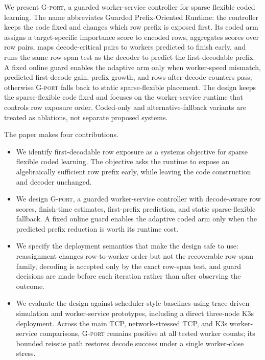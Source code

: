 We present \textsc{G-port}, a guarded worker-service controller for sparse
flexible coded learning.  The name abbreviates Guarded Prefix-Oriented
Runtime: the controller keeps the code fixed and changes which row prefix is
exposed first.  Its coded arm assigns a target-specific importance score to
encoded rows, aggregates scores over row pairs, maps decode-critical pairs to
workers predicted to finish early, and runs the same row-span test as the
decoder to predict the first-decodable prefix.  A fixed online guard
enables the adaptive arm only when worker-speed mismatch, predicted
first-decode gain, prefix growth, and
rows-after-decode counters pass; otherwise \textsc{G-port} falls back to static
sparse-flexible placement.  The design keeps the
sparse-flexible code fixed and focuses on the worker-service runtime that
controls row exposure order.  Coded-only and alternative-fallback variants are
treated as ablations, not separate proposed systems.

The paper makes four contributions.

\begin{itemize}
  \item We identify first-decodable row exposure as a systems objective for
  sparse flexible coded learning.  The objective asks the runtime to expose an
  algebraically sufficient row prefix early, while leaving the code
  construction and decoder unchanged.
  \item We design \textsc{G-port}, a guarded worker-service controller with
  decode-aware row scores, finish-time estimates, first-prefix prediction, and
  static sparse-flexible fallback.  A fixed online guard enables the adaptive
  coded arm only when the predicted prefix reduction is worth its runtime cost.
  \item We specify the deployment semantics that make the design safe to use:
  reassignment changes row-to-worker order but not the recoverable row-span
  family, decoding is accepted only by the exact row-span test, and guard
  decisions are made before each iteration rather than after observing the
  outcome.
  \item We evaluate the design against scheduler-style baselines using
  trace-driven simulation and worker-service prototypes, including a direct
  three-node K3s deployment.  Across the main TCP, network-stressed TCP, and
  K3s worker-service comparisons, \textsc{G-port} remains positive at all tested
  worker counts; its bounded reissue path restores decode success under a
  single worker-close stress.
\end{itemize}
